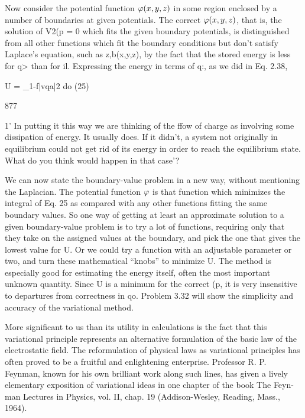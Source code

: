 Now consider the potential function $\varphi(x,y,z)$ in some region enclosed
by a number of boundaries at given potentials. The correct
$\varphi(x,y,z)$, that is, the solution of V2(p = 0 which fits the given boundary
potentials, is distinguished from all other functions which fit the
boundary conditions but don't satisfy Laplace's equation, such as
z,b(x,y,z), by the fact that the stored energy is less for q> than for il.
Expressing the energy in terms of q:, as we did in Eq. 2.38,

U = _1-f|vqa|2 do (25)

877

1' In putting it this way we are thinking of the ffow of charge as involving some dissipation
of energy. It usually does. If it didn't, a system not originally in equilibrium could
not get rid of its energy in order to reach the equilibrium state. What do you think would
happen in that case'?

We can now state the boundary-value problem in a new way,
without mentioning the Laplacian. The potential function $\varphi$ is that
function which minimizes the integral of Eq. 25 as compared with any
other functions fitting the same boundary values. So one way of getting
at least an approximate solution to a given boundary-value
problem is to try a lot of functions, requiring only that they take on
the assigned values at the boundary, and pick the one that gives the
lowest value for U. Or we could try a function with an adjustable
parameter or two, and turn these mathematical ``knobs'' to minimize
U. The method is especially good for estimating the energy
itself, often the most important unknown quantity. Since U is a
minimum for the correct (p, it is very insensitive to departures from
correctness in qo. Problem 3.32 will show the simplicity and accuracy
of the variational method.

More significant to us than its utility in calculations is the fact that
this variational principle represents an alternative formulation of the
basic law of the electrostatic field. The reformulation of physical
laws as variational principles has often proved to be a fruitful and
enlightening enterprise. Professor R. P. Feynman, known for his
own brilliant work along such lines, has given a lively elementary
exposition of variational ideas in one chapter of the book The Feyn-
man Lectures in Physics, vol. II, chap. 19 (Addison-Wesley, Reading,
Mass., 1964).

\fi
